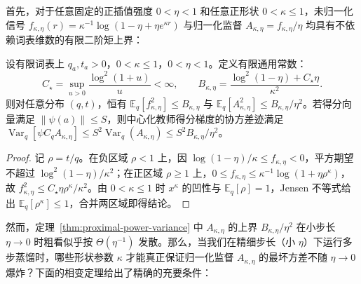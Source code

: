 \documentclass[lang=cn,scheme=chinese,openany]{../book/elegantbook}
\newcommand{\E}{\mathbb E}
\newcommand{\Var}{\operatorname{Var}}
\begin{document}
首先，对于任意固定的正插值强度 $0<\eta<1$ 和任意正形状 $0<\kappa\le 1$，未归一化信号 $f_{\kappa,\eta}(r)=\kappa^{-1}\log(1-\eta+\eta e^{\kappa r})$ 与归一化监督 $A_{\kappa,\eta}=f_{\kappa,\eta}/\eta$ 均具有不依赖词表维数的有限二阶矩上界：

\begin{theorem}
\label{thm:proximal-power-variance}
设有限词表上 $q_a,t_a>0$，$0<\kappa\le 1$，$0<\eta<1$。定义有限通用常数：
\begin{equation}
 C_\star=\sup_{u>0}\frac{\log^2(1+u)}{u}<\infty,\qquad
 B_{\kappa,\eta}=\frac{\log^2(1-\eta)+C_\star\eta}{\kappa^2}.
\end{equation}
则对任意分布 $(q,t)$，恒有 $\E_q[f_{\kappa,\eta}^2]\le B_{\kappa,\eta}$ 与 $\E_q[A_{\kappa,\eta}^2]\le B_{\kappa,\eta}/\eta^2$。若得分向量满足 $\|\psi(a)\|\le S$，则中心化教师得分梯度的协方差迹满足 $\Var_q[\psi C_q A_{\kappa,\eta}]\le S^2\Var_q(A_{\kappa,\eta})\le S^2 B_{\kappa,\eta}/\eta^2$。
\end{theorem}
\begin{proof}
记 $\rho=t/q$。在负区域 $\rho<1$ 上，因 $\log(1-\eta)/\kappa\le f_{\kappa,\eta}<0$，平方期望不超过 $\log^2(1-\eta)/\kappa^2$；在正区域 $\rho\ge 1$ 上，$0\le f_{\kappa,\eta}\le\kappa^{-1}\log(1+\eta\rho^\kappa)$，故 $f_{\kappa,\eta}^2\le C_\star\eta\rho^\kappa/\kappa^2$。由 $0<\kappa\le 1$ 时 $x^\kappa$ 的凹性与 $\E_q[\rho]=1$，Jensen 不等式给出 $\E_q[\rho^\kappa]\le 1$，合并两区域即得结论。
\end{proof}

然而，定理~\ref{thm:proximal-power-variance} 中 $A_{\kappa,\eta}$ 的上界 $B_{\kappa,\eta}/\eta^2$ 在小步长 $\eta\to 0$ 时粗看似乎按 $\Theta(\eta^{-1})$ 发散。那么，当我们在精细步长（小 $\eta$）下运行多步蒸馏时，哪些形状参数 $\kappa$ 才能真正保证归一化监督 $A_{\kappa,\eta}$ 的最坏方差不随 $\eta\to 0$ 爆炸？下面的相变定理给出了精确的充要条件：
\end{document}
